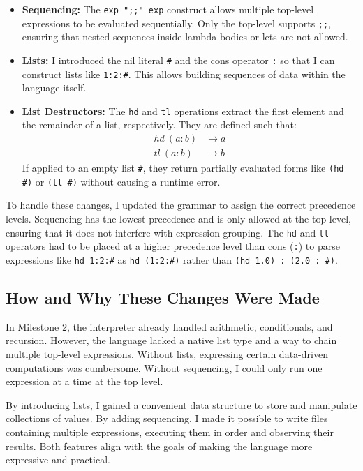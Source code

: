 \documentclass{article}
\theoremstyle{theorem}
\theoremstyle{definition}
\theoremstyle{remark}
\begin{document}
\begin{itemize}
    \item \textbf{Sequencing:} The \texttt{exp ";;" exp} construct allows multiple top-level expressions to be evaluated sequentially. Only the top-level supports \texttt{;;}, ensuring that nested sequences inside lambda bodies or lets are not allowed.
    \item \textbf{Lists:} I introduced the nil literal \texttt{\#} and the cons operator \texttt{:} so that I can construct lists like \texttt{1:2:\#}. This allows building sequences of data within the language itself.
    \item \textbf{List Destructors:} The \texttt{hd} and \texttt{tl} operations extract the first element and the remainder of a list, respectively. They are defined such that:
    \begin{align*}
    hd\ (a:b) &\to a \\
    tl\ (a:b) &\to b
    \end{align*}
    If applied to an empty list \texttt{\#}, they return partially evaluated forms like \texttt{(hd \#)} or \texttt{(tl \#)} without causing a runtime error.
\end{itemize}

To handle these changes, I updated the grammar to assign the correct precedence levels. Sequencing has the lowest precedence and is only allowed at the top level, ensuring that it does not interfere with expression grouping. The \texttt{hd} and \texttt{tl} operators had to be placed at a higher precedence level than cons (\texttt{:}) to parse expressions like \texttt{hd 1:2:\#} as \texttt{hd (1:2:\#)} rather than \texttt{(hd 1.0) : (2.0 : \#)}.

\subsection{How and Why These Changes Were Made}

In Milestone 2, the interpreter already handled arithmetic, conditionals, and recursion. However, the language lacked a native list type and a way to chain multiple top-level expressions. Without lists, expressing certain data-driven computations was cumbersome. Without sequencing, I could only run one expression at a time at the top level.

By introducing lists, I gained a convenient data structure to store and manipulate collections of values. By adding sequencing, I made it possible to write files containing multiple expressions, executing them in order and observing their results. Both features align with the goals of making the language more expressive and practical.
\end{document}
